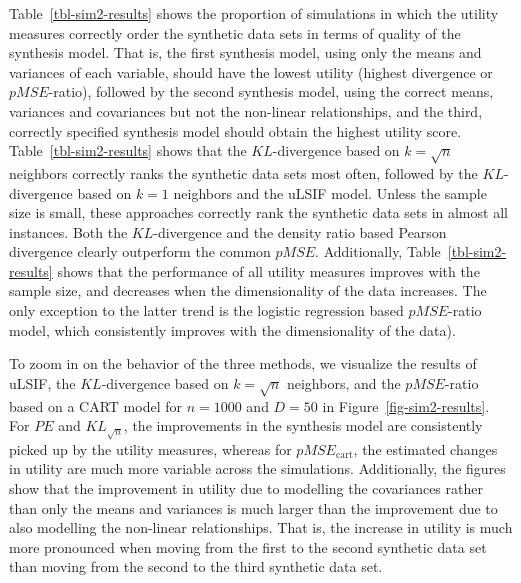 \documentclass[
]{article}
\begin{document}
Table~\ref{tbl-sim2-results} shows the proportion of simulations in
which the utility measures correctly order the synthetic data sets in
terms of quality of the synthesis model. That is, the first synthesis
model, using only the means and variances of each variable, should have
the lowest utility (highest divergence or \(pMSE\)-ratio), followed by
the second synthesis model, using the correct means, variances and
covariances but not the non-linear relationships, and the third,
correctly specified synthesis model should obtain the highest utility
score. Table~\ref{tbl-sim2-results} shows that the \(KL\)-divergence
based on \(k = \sqrt{n}\) neighbors correctly ranks the synthetic data
sets most often, followed by the \(KL\)-divergence based on \(k = 1\)
neighbors and the uLSIF model. Unless the sample size is small, these
approaches correctly rank the synthetic data sets in almost all
instances. Both the \(KL\)-divergence and the density ratio based
Pearson divergence clearly outperform the common \(pMSE\). Additionally,
Table~\ref{tbl-sim2-results} shows that the performance of all utility
measures improves with the sample size, and decreases when the
dimensionality of the data increases. The only exception to the latter
trend is the logistic regression based \(pMSE\)-ratio model, which
consistently improves with the dimensionality of the data).

To zoom in on the behavior of the three methods, we visualize the
results of uLSIF, the \(KL\)-divergence based on \(k = \sqrt{n}\)
neighbors, and the \(pMSE\)-ratio based on a CART model for \(n = 1000\)
and \(D = 50\) in Figure~\ref{fig-sim2-results}. For \(PE\) and
\(KL_{\sqrt{n}}\), the improvements in the synthesis model are
consistently picked up by the utility measures, whereas for
\(pMSE_\text{cart}\), the estimated changes in utility are much more
variable across the simulations. Additionally, the figures show that the
improvement in utility due to modelling the covariances rather than only
the means and variances is much larger than the improvement due to also
modelling the non-linear relationships. That is, the increase in utility
is much more pronounced when moving from the first to the second
synthetic data set than moving from the second to the third synthetic
data set.

\linespread{1}
\end{document}
